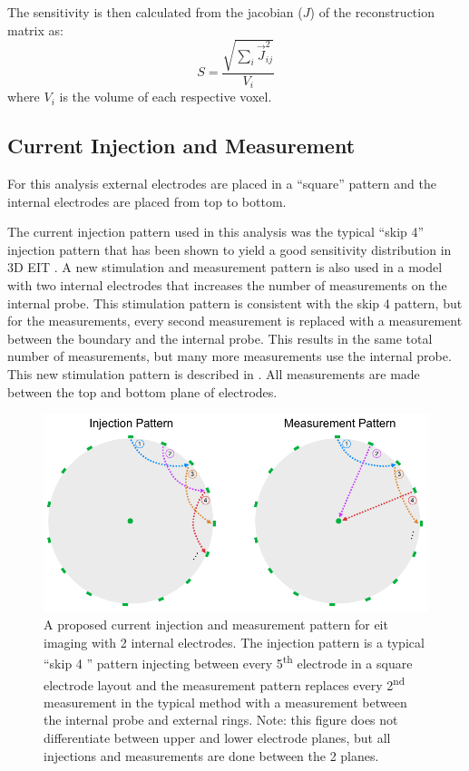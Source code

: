 The sensitivity is then calculated from the jacobian ($J$) of the reconstruction matrix as:
\begin{equation}
	S = \frac{\sqrt{\sum_{i}\vec{J}_{ij}^2}}{V_i}
\end{equation}
where $V_i$ is the volume of each respective voxel. 

\subsection{Current Injection and Measurement}
For this analysis external electrodes are placed in 
a ``square'' pattern \parencite{grychtol_3d_2016} 
and the internal electrodes are placed from top to 
bottom. 

The current injection pattern used in this analysis was the 
typical ``skip 4'' injection pattern that has been shown to yield 
a good sensitivity distribution in 3D EIT \parencite{grychtol_3d_2016}.
A new stimulation and measurement pattern is also used in a model with 
two internal electrodes that increases
the number of measurements on the internal probe. This stimulation 
pattern is consistent with the skip 4 pattern, but 
for the measurements, every second measurement
is replaced with a measurement between the boundary and the internal probe. 
This results in the same total number of measurements, but many more measurements
use the internal probe. This new stimulation pattern is described in . 
All measurements are made between the top and bottom plane of electrodes.

\begin{figure}[H]
\centering
\includegraphics[width=\textwidth]{chapter6-internal_electrodes/imgs/current_injection.pdf}
\caption[Current injection patterns with internal electrodes]{A proposed current injection and measurement pattern for \acrshort{eit} imaging with 2 internal electrodes.
The injection pattern is a typical ``skip 4 '' pattern injecting between every 5\textsuperscript{th} electrode in a square electrode layout and the
measurement pattern replaces every 2\textsuperscript{nd} measurement in the typical method with a measurement between the internal probe and
external rings. Note: this figure does not differentiate between upper and lower electrode planes, but all injections and measurements are done between 
the 2 planes.}
\label{fig:modified_measurement}
\end{figure}

